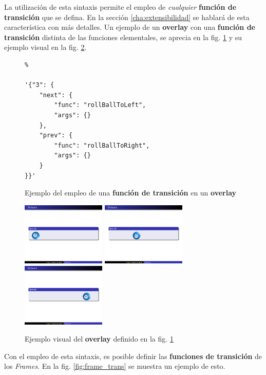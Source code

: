 		La utilización de esta sintaxis permite el empleo de \textit{cualquier} \textbf{función de transición} que se defina. En la sección \ref{cha:extensibilidad} se hablará de esta característica con más detalles. Un ejemplo de un \textbf{overlay} con una \textbf{función de transición} distinta de las funciones elementales, se aprecia en la fig. \ref{fig:ball_code} y su ejemplo visual en la fig. \ref{fig:ball_visual}.



		\begin{figure}[htb]%
			\begin{lstlisting}%

'{"3": {
    "next": {
        "func": "rollBallToLeft",
        "args": {}
    },
    "prev": {
        "func": "rollBallToRight",
        "args": {}
    }
}}'
			\end{lstlisting}
		\caption{Ejemplo del empleo de una \textbf{función de transición} en un \textbf{overlay}} 
			\label{fig:ball_code} 
		\end{figure}	




 		\begin{figure}[tb]
 			\centering
 			\includegraphics[width=4cm]{img/ball-left}
 			\includegraphics[width=4cm]{img/ball-middle}
 			\includegraphics[width=4cm]{img/ball-right}
 			\caption{Ejemplo visual del \textbf{overlay} definido en la fig. \ref{fig:ball_code}}
 			\label{fig:ball_visual} 
 		\end{figure}	


	Con el empleo de esta sintaxis, es posible definir las \textbf{funciones de transición} de los \textit{Frames}. En la fig. \ref{fig:frame_trans} se muestra un ejemplo de esto.

